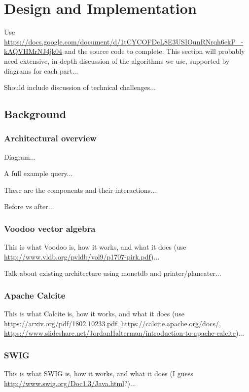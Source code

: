 \chapter{Design and Implementation}

Use \url{https://docs.google.com/document/d/1tCYCOFDeL8E3USIOunRNrqh6ekP_-kAQVHMrNJ4jk04} and the source code to complete. This section will probably need extensive, in-depth discussion of the algorithms we use, supported by diagrams for each part...

Should include discussion of technical challenges...

\section{Background}

\subsection{Architectural overview}

Diagram...

A full example query...

These are the components and their interactions...

Before vs after...

\subsection{Voodoo vector algebra}

This is what Voodoo is, how it works, and what it does (use \url{http://www.vldb.org/pvldb/vol9/p1707-pirk.pdf})...

Talk about existing architecture using monetdb and printer/planeater...

\subsection{Apache Calcite}

This is what Calcite is, how it works, and what it does (use \url{https://arxiv.org/pdf/1802.10233.pdf}, \url{https://calcite.apache.org/docs/}, \url{https://www.slideshare.net/JordanHalterman/introduction-to-apache-calcite})...

\subsection{SWIG}

This is what SWIG is, how it works, and what it does (I guess \url{http://www.swig.org/Doc1.3/Java.html}?)...


